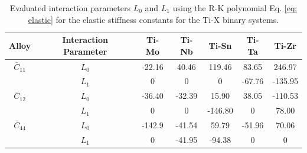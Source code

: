 \newpage
\begin{table}[H]
	\caption{Evaluated interaction parameters $L_0$ and $L_1$ using the R-K polynomial Eq. \ref{eq: elastic} for the elastic stiffness constants for the Ti-X binary systems.}
	\centering
	\begin{tabular}{ c c c c c c c }
		\hline
		Alloy & Interaction Parameter & Ti-Mo & Ti-Nb & Ti-Sn & Ti-Ta & Ti-Zr\\
		\hline
		$\bar{C}_{11}$ & $L_0$ & -22.16 & 40.46 & 119.46 & 83.65 & 246.97\\
		& $L_1$ & 0 & 0 & 0 & -67.76 & -135.95\\
		$\bar{C}_{12}$ & $L_0$ & -36.40 & -32.39 & 15.90 & 38.05 & -110.53\\
		& $L_1$ & 0 & 0 & -146.80 & 0 & 78.00\\
		$\bar{C}_{44}$ & $L_0$ & -142.9 & -41.54 & 59.79 & -51.96 & 70.06\\
		& $L_1$ & 0 & -41.95 & -94.38 & 0 & 0\\	
		\hline
	\end{tabular}
	\label{Ch5-table:tixelasip}
\end{table}
\clearpage

